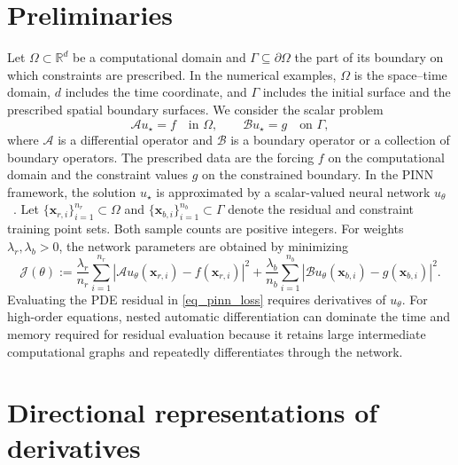 \documentclass[final,oneeqnum]{siamltex}
\newcommand{\R}{\mathbb{R}}
\newcommand{\bx}{\bm{x}}
\newcommand{\abs}[1]{\left|#1\right|}
\begin{document}
\section{Preliminaries}\label{sec_prelim}

Let $\Omega \subset \R^{d}$ be a computational domain and $\Gamma \subseteq \partial \Omega$ the part of its boundary on which constraints are prescribed.
In the numerical examples, $\Omega$ is the space--time domain, $d$ includes the time coordinate, and $\Gamma$ includes the initial surface and the prescribed spatial boundary surfaces.
We consider the scalar problem
\begin{equation}\label{eq_pde}
    \mathcal{A} u_{\star} = f \quad \text{in } \Omega, \quad\quad \mathcal{B} u_{\star} = g \quad \text{on } \Gamma,
\end{equation}
where $\mathcal{A}$ is a differential operator and $\mathcal{B}$ is a boundary operator or a collection of boundary operators.
The prescribed data are the forcing $f$ on the computational domain and the constraint values $g$ on the constrained boundary.
In the PINN framework, the solution $u_{\star}$ is approximated by a scalar-valued neural network $u_{\theta}$~\cite{Lagaris1998,Raissi2019,Sirignano2018,Karniadakis2021}.
Let $\{\bx_{r, i}\}_{i = 1}^{n_r} \subset \Omega$ and $\{\bx_{b, i}\}_{i = 1}^{n_b} \subset \Gamma$ denote the residual and constraint training point sets.
Both sample counts are positive integers.
For weights $\lambda_r, \lambda_b > 0$, the network parameters are obtained by minimizing
\begin{equation}\label{eq_pinn_loss}
    \mathcal{J}(\theta) := \frac{\lambda_r}{n_r} \sum_{i = 1}^{n_r} \abs{\mathcal{A} u_{\theta}(\bx_{r, i}) - f(\bx_{r, i})}^{2} + \frac{\lambda_b}{n_b} \sum_{i = 1}^{n_b} \abs{\mathcal{B} u_{\theta}(\bx_{b, i}) - g(\bx_{b, i})}^{2}.
\end{equation}
Evaluating the PDE residual in \eqref{eq_pinn_loss} requires derivatives of $u_{\theta}$.
For high-order equations, nested automatic differentiation can dominate the time and memory required for residual evaluation because it retains large intermediate computational graphs and repeatedly differentiates through the network.

\section{Directional representations of derivatives}\label{sec_formulation}
\end{document}
